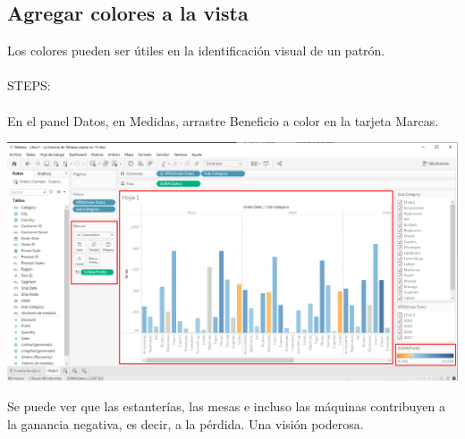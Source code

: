 \documentclass[12pt,letterpaper]{article}
\begin{document}
\subsection{Agregar colores a la vista}
Los colores pueden ser útiles en la identificación visual de un patrón.
\\\\STEPS:
\\\\En el panel Datos, en Medidas, arrastre Beneficio a color en la tarjeta Marcas.
\begin{center}
    \includegraphics[width=16cm]{img/13.png}  
\end{center}
Se puede ver que las estanterías, las mesas e incluso las máquinas contribuyen a la ganancia
negativa, es decir, a la pérdida. Una visión poderosa.
\end{document}
